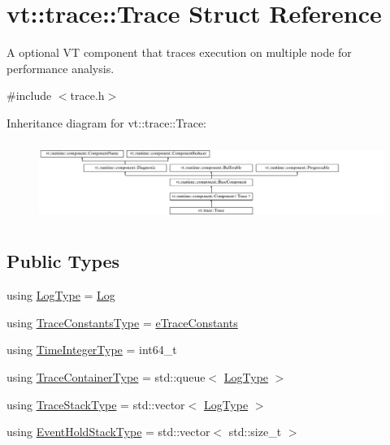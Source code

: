 \hypertarget{structvt_1_1trace_1_1_trace}{}\section{vt\+:\+:trace\+:\+:Trace Struct Reference}
\label{structvt_1_1trace_1_1_trace}


A optional VT component that traces execution on multiple node for performance analysis.  




{\ttfamily \#include $<$trace.\+h$>$}

Inheritance diagram for vt\+:\+:trace\+:\+:Trace\+:\begin{figure}[H]
\begin{center}
\leavevmode
\includegraphics[height=2.592592cm]{structvt_1_1trace_1_1_trace}
\end{center}
\end{figure}
\subsection*{Public Types}
\begin{DoxyCompactItemize}
\item 
using \hyperlink{structvt_1_1trace_1_1_trace_a43306d96a91e49db081eaea016f1dd0a}{Log\+Type} = \hyperlink{structvt_1_1trace_1_1_log}{Log}
\item 
using \hyperlink{structvt_1_1trace_1_1_trace_accb35b20499dfdd46e6c79daae9fc265}{Trace\+Constants\+Type} = \hyperlink{namespacevt_1_1trace_acf454dfbd581b0ebae895f90b5927a1d}{e\+Trace\+Constants}
\item 
using \hyperlink{structvt_1_1trace_1_1_trace_ab8db9218a8ab87f59773fcbf81433787}{Time\+Integer\+Type} = int64\+\_\+t
\item 
using \hyperlink{structvt_1_1trace_1_1_trace_a9d07ee9d9e92f63674da9954cfe9830b}{Trace\+Container\+Type} = std\+::queue$<$ \hyperlink{structvt_1_1trace_1_1_trace_a43306d96a91e49db081eaea016f1dd0a}{Log\+Type} $>$
\item 
using \hyperlink{structvt_1_1trace_1_1_trace_af27d223028d10a196680513defcef3d6}{Trace\+Stack\+Type} = std\+::vector$<$ \hyperlink{structvt_1_1trace_1_1_trace_a43306d96a91e49db081eaea016f1dd0a}{Log\+Type} $>$
\item 
using \hyperlink{structvt_1_1trace_1_1_trace_a727542f4171681f2ef03df2c3abce04c}{Event\+Hold\+Stack\+Type} = std\+::vector$<$ std\+::size\+\_\+t $>$
\end{DoxyCompactItemize}
